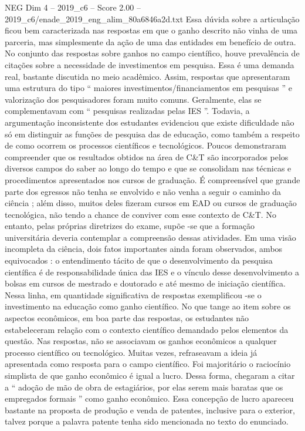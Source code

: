 \begin{textsample}{NEG Dim 4 – 2019\_c6 – Score 2.00 – 2019\_c6/enade\_2019\_eng\_alim\_80a6846a2d.txt}
Essa dúvida sobre a articulação ficou bem caracterizada nas respostas em que o ganho descrito não vinha de uma parceria, mas simplesmente da ação de uma das entidades em benefício de outra.
No conjunto das respostas sobre ganhos no campo científico, houve prevalência de citações sobre a necessidade de investimentos em pesquisa.
Essa é uma demanda real, bastante discutida no meio acadêmico.
Assim, respostas que apresentaram uma estrutura do tipo “ maiores investimentos/financiamentos em pesquisas ” e valorização dos pesquisadores foram muito comuns.
Geralmente, elas se complementavam com “ pesquisas realizadas pelas IES ”.
Todavia, a argumentação inconsistente dos estudantes evidenciou que existe dificuldade não só em distinguir as funções de pesquisa das de educação, como também a respeito de como ocorrem os processos científicos e tecnológicos.
Poucos demonstraram compreender que os resultados obtidos na área de C\&T são incorporados pelos diversos campos do saber ao longo do tempo e que se consolidam nas técnicas e procedimentos apresentados nos cursos de graduação.
É compreensível que grande parte dos egressos não tenha se envolvido e não venha a seguir o caminho da ciência ; além disso, muitos deles fizeram cursos em EAD ou cursos de graduação tecnológica, não tendo a chance de conviver com esse contexto de C\&T.
No entanto, pelas próprias diretrizes do exame, supõe -se que a formação universitária deveria contemplar a compreensão dessas atividades.
Em uma visão incompleta da ciência, dois fatos importantes ainda foram observados, ambos equivocados : o entendimento tácito de que o desenvolvimento da pesquisa científica é de responsabilidade única das IES e o vínculo desse desenvolvimento a bolsas em cursos de mestrado e doutorado e até mesmo de iniciação científica.
Nessa linha, em quantidade significativa de respostas exemplificou -se o investimento na educação como ganho científico.
No que tange ao item sobre os aspectos econômicos, em boa parte das respostas, os estudantes não estabeleceram relação com o contexto científico demandado pelos elementos da questão.
Nas respostas, não se associavam os ganhos econômicos a qualquer processo científico ou tecnológico.
Muitas vezes, refraseavam a ideia já apresentada como resposta para o campo científico.
Foi majoritário o raciocínio simplista de que ganho econômico é igual a lucro.
Dessa forma, chegaram a citar a “ adoção de mão de obra de estagiários, por elas serem mais baratas que os empregados formais ” como ganho econômico.
Essa concepção de lucro apareceu bastante na proposta de produção e venda de patentes, inclusive para o exterior, talvez porque a palavra patente tenha sido mencionada no texto do enunciado.

\end{textsample}
